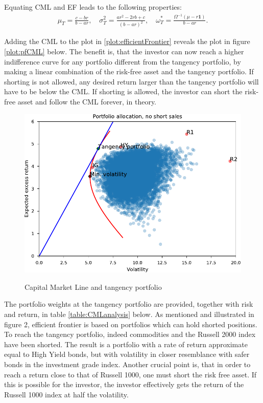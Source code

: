 \documentclass[11pt,a4paper,oneside]{article}
\newcommand{\lp}{\left(}
\newcommand{\rp}{\right)}
\begin{document}
Equating CML and EF leads to the following properties:
\begin{align}
    \mu_T = \frac{c - br}{b - ar}, \quad \sigma_T^2 = \frac{ar^2 - 2rb + c}{\lp b - ar\rp^2}, \quad \omega^*_T = \frac{\Omega^{-1}\lp \mu - r\mathbf{1}\rp}{b - ar}.
\end{align}

Adding the CML to the plot in \ref{plot:efficientFrontier} reveals the plot in figure \ref{plot:pfCML} below. The benefit is, that the investor can now reach a higher indifference curve for any portfolio different from the tangency portfolio, by making a linear combination of the risk-free asset and the tangency portfolio. If shorting is not allowed, any desired return larger than the tangency portfolio will have to be below the CML. If shorting is allowed, the investor can short the risk-free asset and follow the CML forever, in theory.

\begin{figure}[ht]
\centering
\vspace{4mm}
\caption{Capital Market Line and tangency portfolio}
\label{plot:pfAllocTangency}
\includegraphics[scale=0.6]{images/pfCMLtg.pdf}
\begingroup
\vspace{4mm}
\endgroup
\end{figure}

The portfolio weights at the tangency portfolio are provided, together with risk and return, in table \ref{table:CMLanalysis} below. As mentioned and illustrated in figure 2, efficient frontier is based on portfolios which can hold shorted positions. To reach the tangency portfolio, indeed commodities and the Russell 2000 index have been shorted. The result is a portfolio with a rate of return approximate equal to High Yield bonds, but with volatility in closer resemblance with safer bonds in the investment grade index. Another crucial point is, that in order to reach a return close to that of Russell 1000, one must short the risk free asset. If this is possible for the investor, the investor effectively gets the return of the Russell 1000 index at half the volatility.
\end{document}
